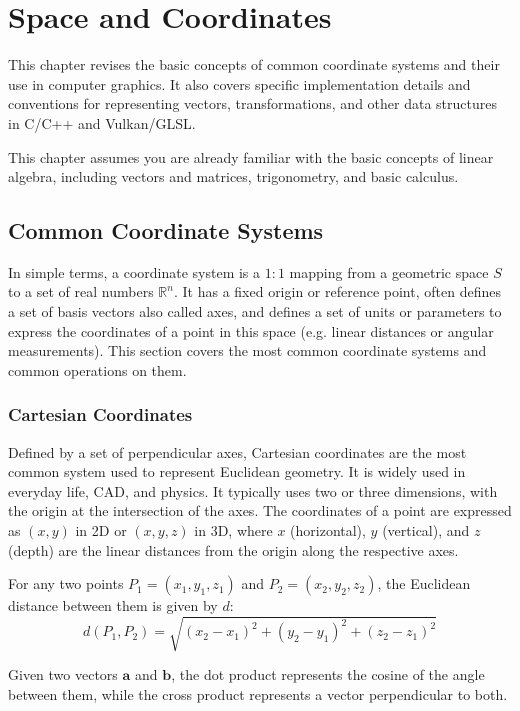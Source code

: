\chapter{Space and Coordinates}\label{ch:coordinates}

This chapter revises the basic concepts of common coordinate systems and their use in computer graphics. 
It also covers specific implementation details and conventions for representing vectors, transformations,
and other data structures in C/C++ and Vulkan/GLSL. 

This chapter assumes you are already familiar with the basic concepts of linear algebra, 
including vectors and matrices, trigonometry, and basic calculus.

\section{Common Coordinate Systems}\label{sec:common-coordinate-systems}

In simple terms, a coordinate system is a $1:1$ mapping from a geometric space $S$ to a set of real numbers $\mathbb{R}^n$.
It has a fixed origin or reference point, often defines a set of basis vectors also called axes, 
and defines a set of units or parameters to express the coordinates of a point in this space
(e.g. linear distances or angular  measurements).  
This section covers the most common coordinate systems and common operations on them\cite{arfken2012mathematical}.

\subsection{Cartesian Coordinates}\label{subsec:cartesian-coordinates}

Defined by a set of perpendicular axes, Cartesian coordinates are the most common system used to represent Euclidean geometry. 
It is widely used in everyday life, CAD, and physics.
It typically uses two or three dimensions, with the origin at the intersection of the axes.
The coordinates of a point are expressed as $(x,y)$ in 2D or $(x,y,z)$ in 3D, 
where $x$ (horizontal), $y$ (vertical), and $z$ (depth) are the linear distances from the origin along the respective axes. 

For any two points $P_1=(x_1,y_1,z_1)$ and $P_2=(x_2,y_2,z_2)$, 
the Euclidean distance between them is given by $d$:
\[
d(P_1,P_2)=\sqrt{(x_2-x_1)^2+(y_2-y_1)^2+(z_2-z_1)^2}
\]

Given two vectors $\mathbf{a}$ and $\mathbf{b}$, the dot product represents the cosine of the angle between them,
while the cross product represents a vector perpendicular to both.


